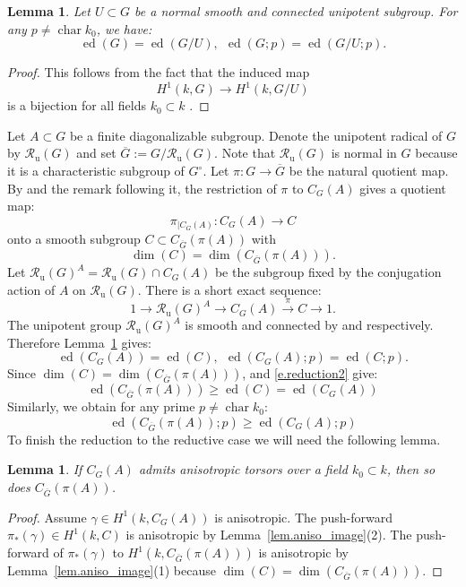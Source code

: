 \documentclass[12pt]{amsart}
\numberwithin{equation}{section}
\newtheorem{lemma}[theorem]{Lemma}
\theoremstyle{definition}
\newcommand{\Ru}{\mathcal{R}_{\mathrm{u}}}
\newcommand{\ed}{\operatorname{ed}}
\newcommand{\Char}{\operatorname{char}}
\begin{document}
\begin{lemma}\label{lem.ed_unipotent_normal}
    Let $U\subset G$ be a normal smooth and connected unipotent subgroup. For any $p\neq \Char k_0$, we have:
    $$\ed(G) = \ed(G/U) , \ \ \ed(G;p)=\ed(G/U;p).$$
\end{lemma}
\begin{proof}
    This follows from the fact that the induced map 
\begin{equation}\label{e.coh_of_unipotent}
H^1(k,G)\to H^1(k,G/U)
\end{equation}
    is a bijection for all fields $k_0 \subset k$ \cite[Lemma 1.13]{sansuc1981groupe}. 
\end{proof}

Let $A\subset G$ be a finite diagonalizable subgroup. Denote the unipotent radical of $G$ by $\Ru(G)$ and set $\overline{G}:= G/\Ru(G)$. Note that $\Ru(G)$ is normal in $G$ because it is a characteristic subgroup of $G^{\circ}$. Let $\pi: G\to \overline{G}$ be the natural quotient map. By \cite[Proposition 9.6]{borel_lag} and the remark following it, the restriction of $\pi$ to $C_G(A)$ gives a quotient map:
$$\pi_{|C_G(A)}: C_G(A) \to C$$
onto a smooth subgroup $C \subset C_{\overline{G}}(\pi(A))$ with
\begin{equation}\label{e.reduction6}
    \dim(C) = \dim(C_{\overline{G}}(\pi(A))).
\end{equation} 
Let $\Ru(G)^{A} = \Ru(G)\cap C_G(A)$ be the subgroup fixed by the conjugation action of $A$ on $\Ru(G)$. There is a short exact sequence:
$$1\to \Ru(G)^A \to C_G(A) \overset{\pi}{\to} C\to 1.$$
The unipotent group $\Ru(G)^A$ is smooth and connected by \cite[Theorem 13.7]{milne2017algebraic} and \cite[Proposition 9.4]{borel_lag} respectively. Therefore Lemma~\ref{lem.ed_unipotent_normal} gives:
\begin{equation}\label{e.reduction2}
\ed(C_G(A)) = \ed(C) , \ \ \ed(C_G(A);p)=\ed(C;p).
\end{equation}
Since $ \dim(C) = \dim(C_{\overline{G}}(\pi(A)))$, \cite[Proposition 3.15]{merkurjev-survey} and \eqref{e.reduction2} give:
\begin{equation}\label{e.reduction3}
    \ed(C_{\overline{G}}(\pi(A))) \geq \ed(C) = \ed(C_G(A))
\end{equation}
Similarly, we obtain for any prime $p\neq \Char k_0$:
\begin{equation}\label{e.reduction4}
    \ed(C_{\overline{G}}(\pi(A));p) \geq \ed(C_G(A);p)
\end{equation}
%
To finish the reduction to the reductive case we will need the following lemma.
\begin{lemma}\label{lem.reduction_to_reductive_aniso}
    If $C_G(A)$ admits anisotropic torsors over a field $k_0\subset k$, then so does $C_{\overline{G}}(\pi(A))$.
\end{lemma}
\begin{proof}
    Assume $\gamma\in H^1(k,C_G(A))$ is anisotropic. The push-forward $\pi_*(\gamma)\in H^1(k,C)$ is anisotropic by Lemma~\ref{lem.aniso_image}(2). The push-forward of $\pi_*(\gamma)$ to $H^1(k,C_{\overline{G}}(\pi(A)))$ is anisotropic by Lemma~\ref{lem.aniso_image}(1) because $\dim(C) = \dim(C_{\overline{G}}(\pi(A)))$.
\end{proof}
\end{document}
